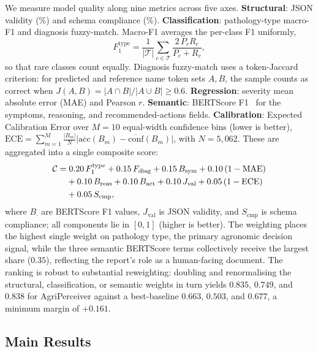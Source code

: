\documentclass[runningheads]{llncs}
\newcommand{\ours}{AgriPerceiver}
\begin{document}
We measure model quality along nine metrics across five axes.
\textbf{Structural}: JSON validity (\%) and schema compliance (\%).
\textbf{Classification}: pathology-type macro-F1 and diagnosis
fuzzy-match. Macro-F1 averages the per-class F1 uniformly,
\begin{equation}
  F_1^{\text{type}} = \frac{1}{|\mathcal{T}|}\sum_{c\in\mathcal{T}}
  \frac{2\,P_c R_c}{P_c + R_c},
  \label{eq:macrof1}
\end{equation}
so that rare classes count equally. Diagnosis fuzzy-match uses a token-Jaccard
criterion: for predicted and reference name token sets $A,B$, the sample counts
as correct when $J(A,B)=|A\cap B|/|A\cup B|\ge 0.6$.
\textbf{Regression}: severity mean absolute error (MAE) and Pearson $r$.
\textbf{Semantic}: BERTScore F1~\cite{zhang2020bertscore} for the
symptoms, reasoning, and recommended-actions fields.
\textbf{Calibration}: Expected Calibration Error over $M{=}10$
equal-width confidence bins (lower is better),
$\mathrm{ECE}=\sum_{m=1}^{M}\frac{|B_m|}{N}
\bigl|\overline{\mathrm{acc}}(B_m)-\overline{\mathrm{conf}}(B_m)\bigr|$,
with $N{=}5{,}062$.
These are aggregated into a single composite score:
\begin{align}
  \mathcal{C} =&\; 0.20\,F_1^{\text{type}}
    + 0.15\,F_{\text{diag}}
    + 0.15\,B_{\text{sym}}
    + 0.10\,(1 - \mathrm{MAE}) \notag\\
    &+ 0.10\,B_{\text{reas}}
    + 0.10\,B_{\text{act}}
    + 0.10\,J_{\text{val}}
    + 0.05\,(1 - \mathrm{ECE}) \notag\\
    &+ 0.05\,S_{\text{cmp}},
  \label{eq:composite}
\end{align}
where $B_{\cdot}$ are BERTScore F1 values, $J_{\text{val}}$ is JSON
validity, and $S_{\text{cmp}}$ is schema compliance; all components
lie in $[0,1]$ (higher is better). The weighting places the highest single weight on
pathology type, the primary agronomic decision signal, while the three semantic
BERTScore terms collectively receive the largest share ($0.35$), reflecting the
report's role as a human-facing document. The ranking is robust to substantial
reweighting: doubling and renormalising the structural, classification, or
semantic weights in turn yields $0.835$, $0.749$, and $0.838$ for \ours{}
against a best-baseline $0.663$, $0.503$, and $0.677$, a minimum margin of
$+0.161$.

\subsection{Main Results}
\label{sec:main}
\end{document}
